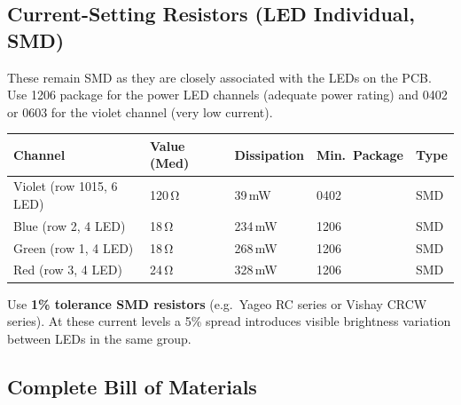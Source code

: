 \documentclass[12pt,letterpaper]{article}
\begin{document}
\subsection{Current-Setting Resistors (LED Individual, SMD)}

These remain SMD as they are closely associated with the LEDs on the PCB. Use 1206
package for the power LED channels (adequate power rating) and 0402 or 0603 for the
violet channel (very low current).

\begin{center}
\begin{tabular}{lllll}
\toprule
\textbf{Channel} & \textbf{Value (Med)} & \textbf{Dissipation} & \textbf{Min.\ Package} & \textbf{Type} \\
\midrule
Violet (row 1015, 6 LED) & 120\,\si{\ohm} & 39\,mW & 0402 & SMD \\
Blue (row 2, 4 LED) & 18\,\si{\ohm} & 234\,mW & 1206 & SMD \\
Green (row 1, 4 LED) & 18\,\si{\ohm} & 268\,mW & 1206 & SMD \\
Red (row 3, 4 LED) & 24\,\si{\ohm} & 328\,mW & 1206 & SMD \\
\bottomrule
\end{tabular}
\end{center}

Use \textbf{1\% tolerance SMD resistors} (e.g.\ Yageo RC series or Vishay CRCW series).
At these current levels a 5\% spread introduces visible brightness variation between
LEDs in the same group.

\subsection{Complete Bill of Materials}
\end{document}
